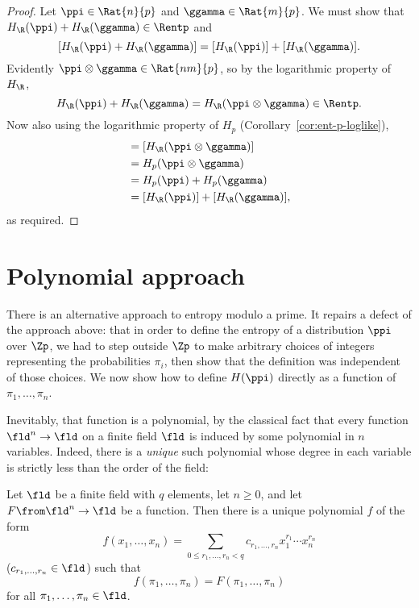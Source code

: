 \begin{proof}
Let $\ppi \in \Rat{n}{p}$ and $\ggamma \in \Rat{m}{p}$.  We must
show that $H_\R(\ppi) + H_\R(\ggamma) \in \Rentp$ and 
\[
[H_\R(\ppi) + H_\R(\ggamma)] 
=
[H_\R(\ppi)] + [H_\R(\ggamma)].
\]
Evidently $\ppi \otimes \ggamma \in \Rat{nm}{p}$, so by the logarithmic
property of $H_\R$,
\[
H_\R(\ppi) + H_\R(\ggamma)
=
H_\R(\ppi \otimes \ggamma)
\in \Rentp. 
\]
Now also using the logarithmic property of $H_p$
(Corollary~\ref{cor:ent-p-loglike}),
% 
\begin{align*}
[H_\R(\ppi) + H_\R(\ggamma)]    
&
= 
[H_\R(\ppi \otimes \ggamma)]    \\
&
=
H_p(\ppi \otimes \ggamma)       \\
&
=
H_p(\ppi) + H_p(\ggamma)        \\
&
=
[H_\R(\ppi)] + [H_\R(\ggamma)],
\end{align*}
% 
as required.
\end{proof}



\section{Polynomial approach}

There is an alternative approach to entropy modulo a prime.  It repairs a
defect of the approach above: that in order to define the entropy of a
distribution $\ppi$ over $\Zp$, we had to step outside $\Zp$ to make
arbitrary choices of integers representing the probabilities $\pi_i$, then
show that the definition was independent of those choices.  We now show how
to define $H(\ppi)$ directly as a function of $\pi_1, \ldots, \pi_n$.

Inevitably, that function is a polynomial, by the classical fact that every
function $\fld^n \to \fld$ on a finite field $\fld$ is induced by some
polynomial in $n$ variables.  Indeed, there is a \emph{unique} such
polynomial whose degree in each variable is strictly less than the order of
the field:

\begin{lemma}
%
%
%
% 
Let $\fld$ be a finite field with $q$ elements, let $n \geq 0$, and let $F
\from \fld^n \to \fld$ be a function.  Then there is a unique polynomial
$f$ of the form
% 
\begin{equation*}
f(x_1, \ldots, x_n)
=
\sum_{0 \leq r_1, \ldots, r_n < q} c_{r_1, \ldots, r_n} 
x_1^{r_1} \cdots x_n^{r_n}
\end{equation*}
% 
($c_{r_1, \ldots, r_n} \in \fld$) such that
\[
f(\pi_1, \ldots, \pi_n) = F(\pi_1, \ldots, \pi_n)
\]
% 
for all $\pi_1, \ldots, \pi_n \in \fld$.
\end{lemma}

